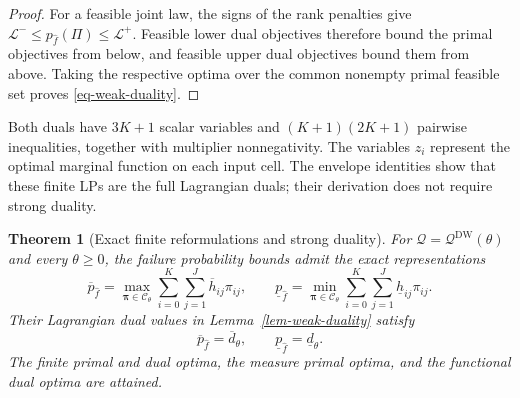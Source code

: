 \documentclass[review,11pt,3p,authoryear,nopreprintline]{elsarticle}
\newtheorem{theorem}{Theorem}
\begin{document}
\begin{proof}
  For a feasible joint law, the signs of the rank penalties give $\mathcal L^-\le p_{\hat f}(\Pi)\le\mathcal L^+$. Feasible lower dual objectives therefore bound the primal objectives from below, and feasible upper dual objectives bound them from above. Taking the respective optima over the common nonempty primal feasible set proves \eqref{eq-weak-duality}.
\end{proof}

Both duals have $3K+1$ scalar variables and $(K+1)(2K+1)$ pairwise inequalities, together with multiplier nonnegativity. The variables $z_i$ represent the optimal marginal function on each input cell. The envelope identities show that these finite LPs are the full Lagrangian duals; their derivation does not require strong duality.

\begin{theorem}[Exact finite reformulations and strong duality]
  \label{thm-finite-dual-reformulations}
  For $\mathcal Q=\mathcal Q^{\mathrm{DW}}(\theta)$ and every $\theta\ge0$, the failure probability bounds admit the exact representations
  \begin{equation}
    \overline p_{\hat f}
      =\max_{\bm\pi\in\mathcal C_\theta}\sum_{i=0}^{K}\sum_{j=1}^{J}\overline h_{ij}\pi_{ij},
    \qquad
    \underline p_{\hat f}
      =\min_{\bm\pi\in\mathcal C_\theta}\sum_{i=0}^{K}\sum_{j=1}^{J}\underline h_{ij}\pi_{ij}.
    \label{eq-finite-primal-values}
  \end{equation}
  Their Lagrangian dual values in Lemma~\ref{lem-weak-duality} satisfy
  \begin{equation}
    \overline p_{\hat f}=\overline d_\theta,
    \qquad
    \underline p_{\hat f}=\underline d_\theta.
    \label{eq-strong-duality}
  \end{equation}
  The finite primal and dual optima, the measure primal optima, and the functional dual optima are attained.
\end{theorem}
\end{document}
